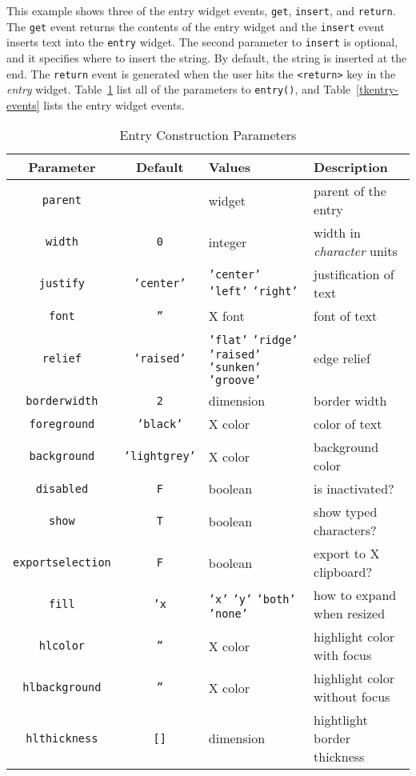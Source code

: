 This example shows three of the entry widget events, {\tt get},
{\tt insert}, and {\tt return}. The {\tt get} event returns
the contents of the entry widget and the {\tt insert} event inserts text 
into the {\tt entry} widget.
The second parameter to {\tt insert} is optional, and it specifies where to
insert the string. By default, the string is inserted at the end. The {\tt return}
event is generated when the user hits the \verb+<return>+ key in the {\em entry}
widget. Table~\ref{tkentry-params} list all of the parameters to \verb+entry()+, and
Table~\ref{tkentry-events} lists the entry widget events.

\begin{table}[tbh]
{\small
\begin{center}
\begin{tabular}{|c|c|p{1.6in}|p{1.6in}|}
\hline
Parameter & Default & Values & Description \\
\hline
\hline
{\tt parent}		& 		& widget & parent of the entry \\ \hline
{\tt width}		& {\tt 0}	& integer & width in {\em character} units\\ \hline
{\tt justify}		& {\tt 'center'}& {\tt 'center'} {\tt 'left'} {\tt 'right'} & justification of text \\ \hline
{\tt font}		& {\tt ''}	& X font & font of text \\ \hline
{\tt relief}		& {\tt 'raised'}& {\tt 'flat'} {\tt 'ridge'} {\tt 'raised'} {\tt 'sunken'} {\tt 'groove'} & edge relief \\ \hline
{\tt borderwidth}	& {\tt 2}	& dimension & border width \\ \hline
{\tt foreground}	& {\tt 'black'}	& X color & color of text \\ \hline
{\tt background}	& {\tt 'lightgrey'}& X color & background color \\ \hline
{\tt disabled}		& {\tt F}	& boolean & is inactivated? \\ \hline
{\tt show}		& {\tt T}	& boolean & show typed characters? \\ \hline
{\tt exportselection}	& {\tt F}	& boolean & export to X clipboard? \\ \hline
{\tt fill}		& {\tt 'x}	& {\tt 'x'} {\tt 'y'} {\tt 'both'} {\tt 'none'} & how to expand when resized \\ \hline
{\tt hlcolor}		& {\tt ''}	& X color & highlight color with focus \\ \hline
{\tt hlbackground}	& {\tt ''}	& X color & highlight color without focus \\ \hline
{\tt hlthickness}	& {\tt []}	& dimension & hightlight border thickness \\ \hline
\end{tabular}
\end{center}
}
\caption{ Entry Construction Parameters }
\label{tkentry-params}
\end{table}

